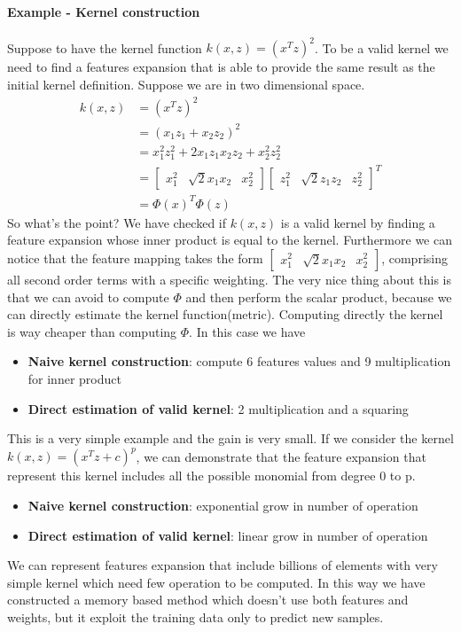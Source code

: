 \documentclass[main.tex]{subfiles}
\begin{document}
\paragraph{Example - Kernel construction}Suppose to have the kernel function $k(x, z) = (x^T z)^2$.
To be a valid kernel we need to find a features expansion that is able to provide the same result as the initial kernel definition. Suppose we are in two dimensional space.
\begin{align*}
    k(x,z) &= (x^T z)^2 \\
    &= (x_1z_1 + x_2z_2)^2 \\
    &= x_1^2z_1^2 + 2x_1z_1x_2z_2 + x_2^2z_2^2 \\
    &= \begin{bmatrix} x_1^2 & \sqrt{2}x_1x_2 & x_2^2\end{bmatrix}\begin{bmatrix} z_1^2 & \sqrt{2}z_1z_2 & z_2^2\end{bmatrix}^T \\
    &= \Phi(x)^T \Phi(z)
\end{align*}
So what's the point? We have checked if $k(x,z)$ is a valid kernel by finding a feature expansion whose inner product is equal to the kernel. Furthermore we can notice that the feature mapping takes the form $\begin{bmatrix} x_1^2 & \sqrt{2}x_1x_2 & x_2^2\end{bmatrix}$, comprising all second order terms with a specific weighting. The very nice thing about this is that we can avoid to compute $\Phi$ and then perform the scalar product, because we can directly estimate the kernel function(metric). Computing directly the kernel is way cheaper than computing $\Phi$.
In this case we have
\begin{itemize}
    \item \textbf{Naive kernel construction}: compute 6 features values and 9 multiplication for inner product
    \item \textbf{Direct estimation of valid kernel}: 2 multiplication and a squaring
\end{itemize}
This is a very simple example and the gain is very small. If we consider the kernel $k(x,z) = (x^T z + c)^p$, we can demonstrate that the feature expansion that represent this kernel includes all the possible monomial from degree 0 to p.
\begin{itemize}
    \item \textbf{Naive kernel construction}: exponential grow in number of operation
    \item \textbf{Direct estimation of valid kernel}: linear grow in number of operation
\end{itemize}
We can represent features expansion that include billions of elements with very simple kernel which need few operation to be computed.
In this way we have constructed a memory based method which doesn't use both features and weights, but it exploit the training data only to predict new samples.
\end{document}
